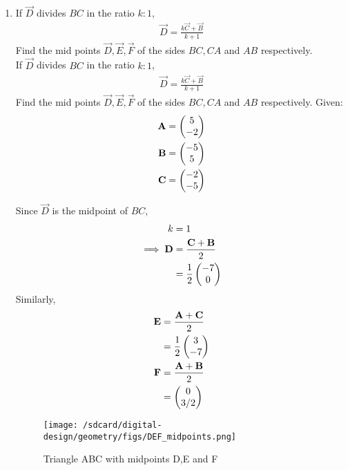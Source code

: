 \documentclass[11pt]{book}
\begin{document}
\begin{enumerate}[label=\thesection.\arabic*.,ref=\thesection.\theenumi]

\item  If $\vec{D}$ divides $BC$ in the ratio $k : 1$,
		\begin{align}
			\vec{D}= \frac{k\vec{C}+\vec{B}}{k+1}
		\end{align}
Find the mid points $\vec{D}, \vec{E}, \vec{F}$ of the sides $BC, CA$ and $AB$ respectively.\\
If $\vec{D}$ divides $BC$ in the ratio $k : 1$,
\begin{align}
\vec{D}= \frac{k\vec{C}+\vec{B}}{k+1}
\end{align}
Find the mid points $\vec{D}, \vec{E}, \vec{F}$ of the sides $BC, CA$ and $AB$ respectively.
\newline
Given:
\begin{align}
\mathbf{A} &= \begin{pmatrix}5\\-2\\\end{pmatrix}\\
\mathbf{B} &= \begin{pmatrix}-5\\5\\\end{pmatrix}\\
\mathbf{C} &= \begin{pmatrix}-2\\-5\\\end{pmatrix}
\end{align}

\solution
Since $\vec{D}$ is the midpoint of $BC$,
\begin{align}
k &= 1\\
\implies \mathbf{D} &= \frac{\mathbf{C} + \mathbf{B}}{2}\\
&= \frac{1}{2}\begin{pmatrix}-7\\0\end{pmatrix}
\end{align}
Similarly,
\begin{align}
\mathbf{E} &= \frac{\mathbf{A} + \mathbf{C}}{2}\\
&= \frac{1}{2}\begin{pmatrix}3\\-7\end{pmatrix}\\
\mathbf{F} &= \frac{\mathbf{A} + \mathbf{B}}{2}\\
&= \begin{pmatrix}0\\3/2\end{pmatrix}
\end{align}
\begin{figure}[H]
\centering
\texttt{[image: /sdcard/digital-design/geometry/figs/DEF\_midpoints.png]}
\caption{Triangle ABC with midpoints D,E and F}
\end{figure}  


\end{enumerate}
\end{document}
